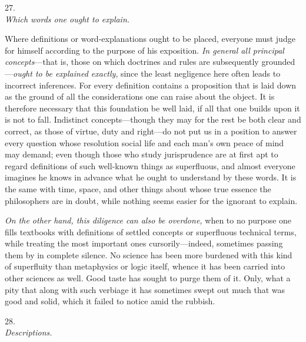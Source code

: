 \documentclass[12pt,a4paper]{article}
\newcommand{\logsec}[2]{%
  \bigskip\begin{center}{\large #1}\\[4pt]{\emph{#2}}\end{center}\smallskip}
\begin{document}
\logsec{27.}{Which words one ought to explain.}

\noindent
Where definitions or word-explanations ought to be placed, everyone must judge
for himself according to the purpose of his exposition. \emph{In general all
principal concepts}---that is, those on which doctrines and rules are
subsequently grounded---\emph{ought to be explained exactly}, since the least
negligence here often leads to incorrect inferences. For every definition
contains a proposition that is laid down as the ground of all the considerations
one can raise about the object. It is therefore necessary that this foundation
be well laid, if all that one builds upon it is not to fall. Indistinct
concepts---though they may for the rest be both clear and correct, as those of
virtue, duty and right---do not put us in a position to answer every question
whose resolution social life and each man's own peace of mind may demand; even
though those who study jurisprudence are at first apt to regard definitions of
such well-known things as superfluous, and almost everyone imagines he knows in
advance what he ought to understand by these words. It is the same with time,
space, and other things about whose true essence the philosophers are in doubt,
while nothing seems easier for the ignorant to explain.

\emph{On the other hand, this diligence can also be overdone,} when to no
purpose one
fills textbooks with definitions of settled concepts or superfluous technical
terms, while treating the most important ones cursorily---indeed, sometimes
passing them by in complete silence. No science has been more burdened with this
kind of superfluity than metaphysics or logic itself, whence it has been carried
into other sciences as well. Good taste has sought to purge them of it. Only,
what a pity that along with such verbiage it has sometimes swept out much that
was good and solid, which it failed to notice amid the rubbish.

\logsec{28.}{Descriptions.}
\end{document}
